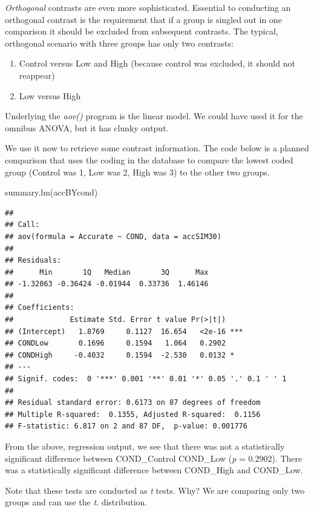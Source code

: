 \documentclass[
  english,
]{book}
\newenvironment{Shaded}{\begin{snugshade}}{\end{snugshade}}
\newcommand{\FunctionTok}[1]{\textcolor[rgb]{0.00,0.00,0.00}{#1}}
\newcommand{\NormalTok}[1]{#1}
\providecommand{\tightlist}{%
  \setlength{\itemsep}{0pt}\setlength{\parskip}{0pt}}
\begin{document}
\emph{Orthogonal} contrasts are even more sophisticated. Essential to conducting an orthogonal contrast is the requirement that if a group is singled out in one comparison it should be excluded from subsequent contrasts. The typical, orthogonal scenario with three groups has only two contrasts:

\begin{enumerate}
\def\labelenumi{\arabic{enumi}.}
\tightlist
\item
  Control versus Low and High (because control was excluded, it should not reappear)
\item
  Low versus High
\end{enumerate}

Underlying the \emph{aov()} program is the linear model. We could have used it for the omnibus ANOVA, but it has clunky output.

We use it now to retrieve some contrast information. The code below is a planned comparison that uses the coding in the database to compare the lowest coded group (Control was 1, Low was 2, High was 3) to the other two groups.

\begin{Shaded}
\begin{Highlighting}[]
\FunctionTok{summary.lm}\NormalTok{(accBYcond)}
\end{Highlighting}
\end{Shaded}

\begin{verbatim}
## 
## Call:
## aov(formula = Accurate ~ COND, data = accSIM30)
## 
## Residuals:
##      Min       1Q   Median       3Q      Max 
## -1.32063 -0.36424 -0.01944  0.33736  1.46146 
## 
## Coefficients:
##             Estimate Std. Error t value Pr(>|t|)    
## (Intercept)   1.8769     0.1127  16.654   <2e-16 ***
## CONDLow       0.1696     0.1594   1.064   0.2902    
## CONDHigh     -0.4032     0.1594  -2.530   0.0132 *  
## ---
## Signif. codes:  0 '***' 0.001 '**' 0.01 '*' 0.05 '.' 0.1 ' ' 1
## 
## Residual standard error: 0.6173 on 87 degrees of freedom
## Multiple R-squared:  0.1355, Adjusted R-squared:  0.1156 
## F-statistic: 6.817 on 2 and 87 DF,  p-value: 0.001776
\end{verbatim}

From the above, regression output, we see that there was not a statistically significant difference between COND\_Control COND\_Low (\emph{p} = 0.2902). There was a statistically significant difference between COND\_High and COND\_Low.

Note that these tests are conducted as \emph{t} tests. Why? We are comparing only two groups and can use the \emph{t}. distribution.
\end{document}
